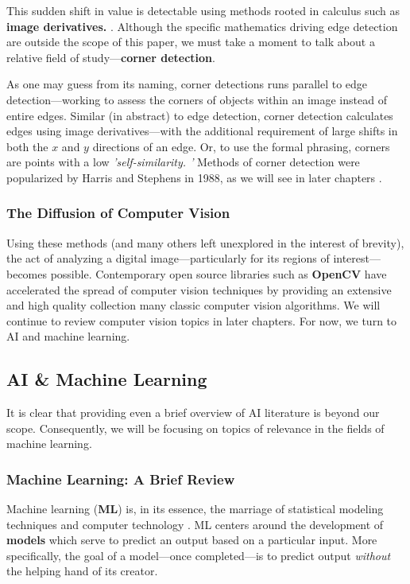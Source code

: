 \documentclass{report}
\newcommand{\tech}[1]{\textbf{#1}}
\begin{document}
This sudden shift in value is detectable using methods rooted in calculus such as \tech{image derivatives.} \cite{hashimoto1987multiple}. Although the specific mathematics driving edge detection are outside the scope of this paper, we must take a moment to talk about a relative field of study---\tech{corner detection}. 

As one may guess from its naming, corner detections runs parallel to edge detection---working to assess the corners of objects within an image instead of entire edges. Similar (in abstract) to edge detection, corner detection calculates edges using image derivatives---with the additional requirement of large shifts in both the $x$ and $y$ directions of an edge. Or, to use the formal phrasing, corners are points with a low \emph{'self-similarity. \cite{maver2009self}'} Methods of corner detection were popularized by Harris and Stephens in 1988, as we will see in later chapters \cite{Harris}. 

\subsubsection{The Diffusion of Computer Vision}

Using these methods (and many others left unexplored in the interest of brevity), the act of analyzing a digital image---particularly for its regions of interest---becomes possible. Contemporary open source libraries such as \tech{OpenCV} \cite{opencv_library} have accelerated the spread of computer vision techniques by providing an extensive and high quality collection many classic computer vision algorithms. We will continue to review computer vision topics in later chapters. For now, we turn to AI and machine learning. 

\subsection{AI \& Machine Learning}
It is clear that providing even a brief overview of AI literature is beyond our scope. Consequently, we will be focusing on topics of relevance in the fields of machine learning.

\subsubsection{Machine Learning: A Brief Review}
Machine learning (\tech{ML}) is, in its essence, the marriage of statistical modeling techniques and computer technology \cite{mahesh2020machine}. ML centers around the development of \tech{models} which serve to predict an output based on a particular input. More specifically, the goal of a model---once completed---is to predict output \emph{without} the helping hand of its creator. 
\end{document}
